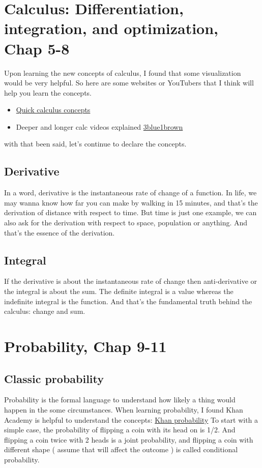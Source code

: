 \documentclass{article}
\begin{document}
\section{Calculus: Differentiation, integration, and optimization, Chap 5-8}
Upon learning the new concepts of calculus, I found that some visualization would be very helpful. So here are some websites or YouTubers that I think will help you learn the concepts.
\begin{itemize}
    \item  \href{https://www.mathsisfun.com/calculus/index.html}{Quick calculus concepts }
    \item Deeper and longer calc videos explained \href{https://www.3blue1brown.com/topics/calculus}{3blue1brown}
\end{itemize}
with that been said, let's continue to declare the concepts.

\subsection{Derivative}
In a word, derivative is the instantaneous rate of change of a function. In life, we may wanna know how far you can make by walking in 15 minutes, and that's the derivation of distance with respect to time. But time is just one example, we can also ask for the derivation with respect to space, population or anything. And that's the essence of the derivation.

\subsection{Integral}
If the derivative is about the instantaneous rate of change then anti-derivative or the integral is about the sum. The definite integral is a value whereas the indefinite integral is the function. And that's the fundamental truth behind the calculus: change and sum.

\section{Probability, Chap 9-11}
\subsection{Classic probability}
Probability is the formal language to understand how likely a thing would happen in the some circumstances. When learning probability, I found Khan Academy is helpful to understand the concepts: \hyperlink{https://www.khanacademy.org/math/statistics-probability/probability-library}{Khan probability}
\newline To start with a simple case, the probability of flipping a coin with its head on is 1/2. And flipping a coin twice with 2 heads is a joint probability, and flipping a coin with different shape ( assume that will affect the outcome ) is called conditional probability.
\end{document}
